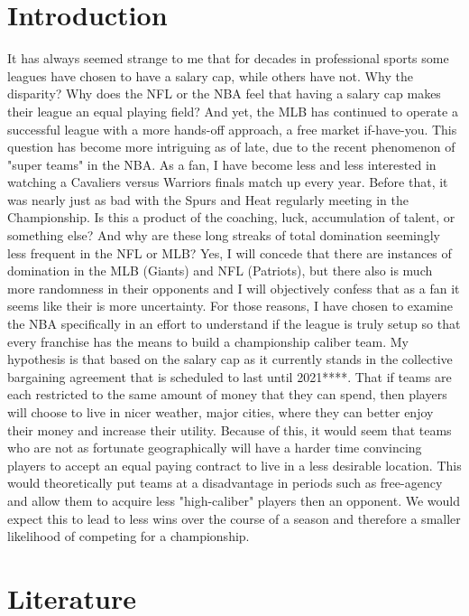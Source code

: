 \documentclass[12pt,english]{article}
\begin{document}
\section{Introduction}\label{sec:intro}
It has always seemed strange to me that for decades in professional sports some leagues have chosen to have a salary cap, while others have not. Why the disparity? Why does the NFL or the NBA feel that having a salary cap makes their league an equal playing field? And yet, the MLB has continued to operate a successful league with a more hands-off approach, a free market if-have-you. This question has become more intriguing as of late, due to the recent phenomenon of "super teams" in the NBA.  As a fan, I have become less and less interested in watching a Cavaliers versus Warriors finals match up every year. Before that, it was nearly just as bad with the Spurs and Heat regularly meeting in the Championship. Is this a product of the coaching, luck, accumulation of talent, or something else? And why are these long streaks of total domination seemingly less frequent in the NFL or MLB? Yes, I will concede that there are instances of domination in the MLB (Giants) and NFL (Patriots), but there also is much more randomness in their opponents and I will objectively confess that as a fan it seems like their is more uncertainty. 
For those reasons, I have chosen to examine the NBA specifically in an effort to understand if the league is truly setup so that every franchise has the means to build a championship caliber team. My hypothesis is that based on the salary cap as it currently stands in the collective bargaining agreement that is scheduled to last until 2021****. That if teams are each restricted to the same amount of money that they can spend, then players will choose to live in nicer weather, major cities, where they can better enjoy their money and increase their utility. Because of this, it would seem that teams who are not as fortunate geographically will have a harder time convincing players to accept an equal paying contract to live in a less desirable location. This would theoretically put teams at a disadvantage in periods such as free-agency and allow them to acquire less "high-caliber" players then an opponent. We would expect this to lead to less wins over the course of a season and therefore a smaller likelihood of competing for a championship. 


\section{Literature} \label{sec:litreview}
\end{document}
